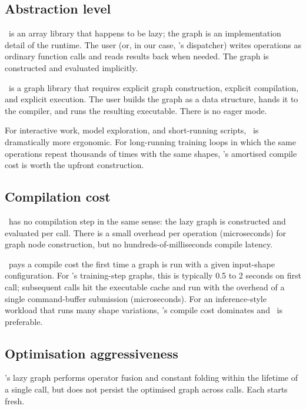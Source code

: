 \subsection{Abstraction level}
\label{ssec:metal_mpsgraph:abstraction}

\MLX\ is an array library that happens to be lazy; the graph is an
implementation detail of the runtime. The user (or, in our case,
\Lucid's dispatcher) writes operations as ordinary function calls
and reads results back when needed. The graph is constructed and
evaluated implicitly.

\MPSGraph\ is a graph library that requires explicit graph
construction, explicit compilation, and explicit execution. The user
builds the graph as a data structure, hands it to the compiler, and
runs the resulting executable. There is no eager mode.

For interactive work, model exploration, and short-running scripts,
\MLX\ is dramatically more ergonomic. For long-running training
loops in which the same operations repeat thousands of times with
the same shapes, \MPSGraph's amortised compile cost is worth the
upfront construction.

\subsection{Compilation cost}
\label{ssec:metal_mpsgraph:compile_cost}

\MLX\ has no compilation step in the same sense: the lazy graph is
constructed and evaluated per call. There is a small overhead per
operation (microseconds) for graph node construction, but no
hundreds-of-milliseconds compile latency.

\MPSGraph\ pays a compile cost the first time a graph is run with a
given input-shape configuration. For \Lucid's training-step graphs,
this is typically 0.5 to 2 seconds on first call; subsequent calls
hit the executable cache and run with the overhead of a single
command-buffer submission (microseconds). For an inference-style
workload that runs many shape variations, \MPSGraph's compile cost
dominates and \MLX\ is preferable.

\subsection{Optimisation aggressiveness}
\label{ssec:metal_mpsgraph:opt_aggression}

\MLX's lazy graph performs operator fusion and constant folding
within the lifetime of a single  call, but does not
persist the optimised graph across calls. Each  starts
fresh.

